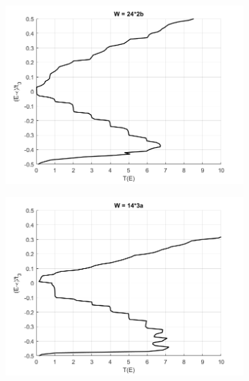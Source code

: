 \documentclass{beamer}
\begin{document}
{\begin{frame}
\begin{figure}[!htbp]
   \begin{subfigure}{0.35\textwidth}
   \includegraphics[width=\linewidth]{T_armchair.png}
   \end{subfigure}
   \hspace{0.5cm}
   \begin{subfigure}{0.35\textwidth}
   \includegraphics[width=\linewidth]{T_zigzag.png}
   \end{subfigure}
\end{figure}

    \end{frame} 
}
\end{document}
